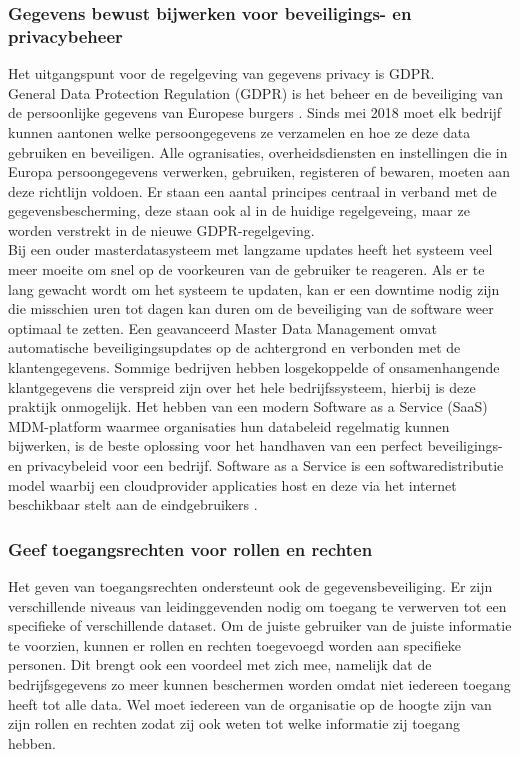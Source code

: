 \subsubsection{Gegevens bewust bijwerken voor beveiligings- en privacybeheer}
Het uitgangspunt voor de regelgeving van gegevens privacy is GDPR.
\\General Data Protection Regulation (GDPR) is het beheer en de beveiliging van de persoonlijke gegevens van Europese burgers \autocite{Vlaanderen}. Sinds mei 2018 moet elk bedrijf kunnen aantonen welke persoongegevens ze verzamelen en hoe ze deze data gebruiken en beveiligen. Alle ogranisaties, overheidsdiensten en instellingen die in Europa persoongegevens verwerken, gebruiken, registeren of bewaren, moeten aan deze richtlijn voldoen. Er staan een aantal principes centraal in verband met de gegevensbescherming, deze staan ook al in de huidige regelgeveing, maar ze worden verstrekt in de nieuwe GDPR-regelgeving.
\\Bij een ouder masterdatasysteem met langzame updates heeft het systeem veel meer moeite om snel op de voorkeuren van de gebruiker te reageren. Als er te lang gewacht wordt om het systeem te updaten, kan er een downtime nodig zijn die misschien uren tot dagen kan duren om de beveiliging van de software weer optimaal te zetten. Een geavanceerd Master Data Management omvat automatische beveiligingsupdates op de achtergrond en verbonden met de klantengegevens. Sommige bedrijven hebben losgekoppelde of onsamenhangende klantgegevens die verspreid zijn over het hele bedrijfssysteem, hierbij is deze praktijk onmogelijk. Het hebben van een modern Software as a Service (SaaS) MDM-platform waarmee organisaties hun databeleid regelmatig kunnen bijwerken, is de beste oplossing voor het handhaven van een perfect beveiligings- en privacybeleid voor een bedrijf. Software as a Service is een softwaredistributie model waarbij een cloudprovider applicaties host en deze via het internet beschikbaar stelt aan de eindgebruikers \autocite{Chai2022}.

\subsubsection{Geef toegangsrechten voor rollen en rechten}
Het geven van toegangsrechten ondersteunt ook de gegevensbeveiliging. Er zijn verschillende niveaus van leidinggevenden nodig om toegang te verwerven tot een specifieke of verschillende dataset. Om de juiste gebruiker van de juiste informatie te voorzien, kunnen er rollen en rechten toegevoegd worden aan specifieke personen. Dit brengt ook een voordeel met zich mee, namelijk dat de bedrijfsgegevens zo meer kunnen beschermen worden omdat niet iedereen toegang heeft tot alle data. Wel moet iedereen van de organisatie op de hoogte zijn van zijn rollen en rechten zodat zij ook weten tot welke informatie zij toegang hebben. 

